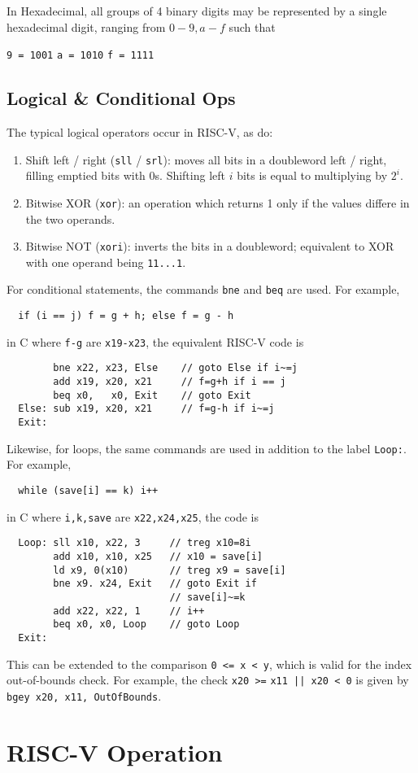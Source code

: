 \documentclass{tufte-book}
\begin{document}
In Hexadecimal, all groups of 4 binary digits may be represented by a single hexadecimal digit, ranging from $0 - 9, a - f$ such that \begin{center}
  \verb|9 = 1001| \qquad \verb|a = 1010| \qquad \verb|f = 1111|
\end{center}

\section{Logical \& Conditional Ops}
The typical logical operators occur in RISC-V, as do:
\begin{enumerate}
  \item Shift left / right (\verb|sll| / \verb|srl|): moves all bits in a doubleword left / right, filling emptied bits with 0s. Shifting left $i$ bits is equal to multiplying by $2^i$.
  \item Bitwise XOR (\verb|xor|): an operation which returns 1 only if the values differe in the two operands.
  \item Bitwise NOT (\verb|xori|): inverts the bits in a doubleword; equivalent to XOR with one operand being \verb|11...1|.
\end{enumerate}
For conditional statements, the commands \verb|bne| and \verb|beq| are used. For example,
\begin{verbatim}
  if (i == j) f = g + h; else f = g - h
\end{verbatim}
in C where \verb|f-g| are \verb|x19-x23|, the equivalent RISC-V code is \begin{lstlisting}
        bne x22, x23, Else    // goto Else if i~=j
        add x19, x20, x21     // f=g+h if i == j
        beq x0,   x0, Exit    // goto Exit
  Else: sub x19, x20, x21     // f=g-h if i~=j
  Exit:
\end{lstlisting}
Likewise, for loops, the same commands are used in addition to the label \verb|Loop:|. For example,
\begin{verbatim}
  while (save[i] == k) i++
\end{verbatim}
in C where \verb|i,k,save| are \verb|x22,x24,x25|, the code is \begin{lstlisting}
  Loop: sll x10, x22, 3     // treg x10=8i
        add x10, x10, x25   // x10 = save[i]
        ld x9, 0(x10)       // treg x9 = save[i]
        bne x9. x24, Exit   // goto Exit if
                            // save[i]~=k
        add x22, x22, 1     // i++
        beq x0, x0, Loop    // goto Loop
  Exit:
\end{lstlisting}
This can be extended to the comparison \verb|0 <= x < y|, which is valid for the index out-of-bounds check. For example, the check \verb$x20 >=$ \verb$x11 || x20 < 0$ is given by \verb$bgey x20, x11, OutOfBounds$.

\chapter{RISC-V Operation}
\end{document}
